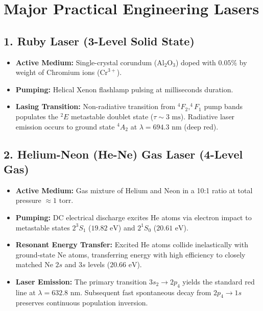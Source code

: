 \section{Major Practical Engineering Lasers}

\subsection{1. Ruby Laser (3-Level Solid State)}
\begin{itemize}[itemsep=2pt]
    \item \textbf{Active Medium:} Single-crystal corundum ($\text{Al}_2\text{O}_3$) doped with $0.05\%$ by weight of Chromium ions ($\text{Cr}^{3+}$).
    \item \textbf{Pumping:} Helical Xenon flashlamp pulsing at milliseconds duration.
    \item \textbf{Lasing Transition:} Non-radiative transition from $^4F_2, ^4F_1$ pump bands populates the $^2E$ metastable doublet state ($\tau \sim 3\text{ ms}$). Radiative laser emission occurs to ground state $^4A_2$ at $\lambda = 694.3\text{ nm}$ (deep red).
\end{itemize}

\subsection{2. Helium-Neon (He-Ne) Gas Laser (4-Level Gas)}
\begin{itemize}[itemsep=2pt]
    \item \textbf{Active Medium:} Gas mixture of Helium and Neon in a 10:1 ratio at total pressure $\approx 1\text{ torr}$.
    \item \textbf{Pumping:} DC electrical discharge excites He atoms via electron impact to metastable states $2^3S_1$ ($19.82\text{ eV}$) and $2^1S_0$ ($20.61\text{ eV}$).
    \item \textbf{Resonant Energy Transfer:} Excited He atoms collide inelastically with ground-state Ne atoms, transferring energy with high efficiency to closely matched Ne $2s$ and $3s$ levels ($20.66\text{ eV}$).
    \item \textbf{Laser Emission:} The primary transition $3s_2 \to 2p_4$ yields the standard red line at $\lambda = 632.8\text{ nm}$. Subsequent fast spontaneous decay from $2p_4 \to 1s$ preserves continuous population inversion.
\end{itemize}

